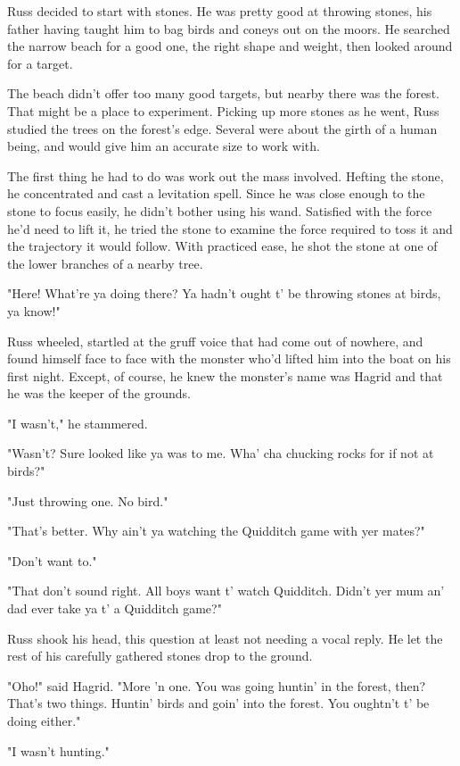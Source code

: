 Russ decided to start with stones. He was pretty good at throwing stones, his father having taught him to bag birds and coneys out on the moors. He searched the narrow beach for a good one, the right shape and weight, then looked around for a target.

The beach didn't offer too many good targets, but nearby there was the forest. That might be a place to experiment. Picking up more stones as he went, Russ studied the trees on the forest's edge. Several were about the girth of a human being, and would give him an accurate size to work with.

The first thing he had to do was work out the mass involved. Hefting the stone, he concentrated and cast a levitation spell. Since he was close enough to the stone to focus easily, he didn't bother using his wand. Satisfied with the force he'd need to lift it, he tried the stone to examine the force required to toss it and the trajectory it would follow. With practiced ease, he shot the stone at one of the lower branches of a nearby tree.

"Here! What're ya doing there? Ya hadn't ought t' be throwing stones at birds, ya know!"

Russ wheeled, startled at the gruff voice that had come out of nowhere, and found himself face to face with the monster who'd lifted him into the boat on his first night. Except, of course, he knew the monster's name was Hagrid and that he was the keeper of the grounds.

"I{\el} wasn't," he stammered.

"Wasn't? Sure looked like ya was to me. Wha' cha chucking rocks for if not at birds?"

"Just{\el} throwing one. No{\el} bird."

"That's better. Why ain't ya watching the Quidditch game with yer mates?"

"Don't{\el} want to."

"That don't sound right. All boys want t' watch Quidditch. Didn't yer mum an' dad ever take ya t' a Quidditch game?"

Russ shook his head, this question at least not needing a vocal reply. He let the rest of his carefully gathered stones drop to the ground.

"Oho!" said Hagrid. "More 'n one. You was going huntin' in the forest, then? That's two things. Huntin' birds and goin' into the forest. You oughtn't t' be doing either."

"I{\el} wasn't{\el} hunting."

